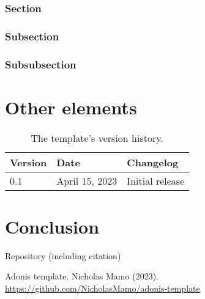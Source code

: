 \documentclass{adonis}
\begin{document}
			\subsubsection{Section}
			
			\subsubsection{Subsection}
			
			\subsubsection{Subsubsection}
			
	\section{Other elements}
	
		\begin{table*}[t!]
			\begin{tabularx}{\linewidth}{ l l X }
				\textbf{Version} & \textbf{Date} & \textbf{Changelog} \\ \hline
				0.1 & April 15, 2023 & Initial release \\
			\end{tabularx}
			\caption{The template's version history.}
			\label{table: version history}
		\end{table*}
			
	\section{Conclusion}
	
	
		Repository (including citation) \cite{repository}
		
	\begin{thebibliography}{9}
		Adonis template. Nicholas Mamo (2023). \url{https://github.com/NicholasMamo/adonis-template}
	\end{thebibliography}
	
\end{document}
